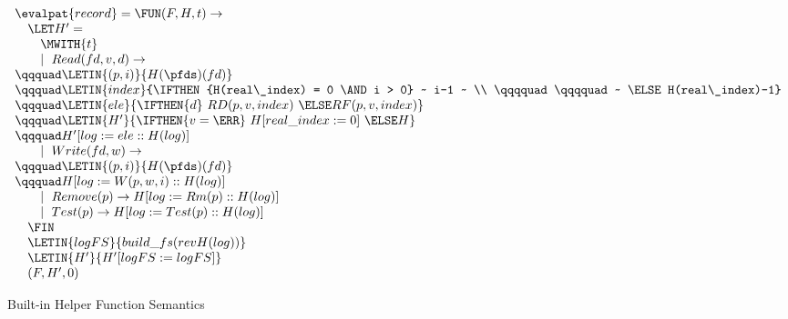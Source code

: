 \begin{figure*}
\begin{minipage}[t]{0.5\linewidth}
\begin{displaymath}
\begin{array}{l}
\\
\evalpat{record} = \FUN (F,H,t) \rightarrow \\
\quad \LET H' = \\
\qquad \MWITH{t} \\
\qquad \mid~Read(fd,v,d) \rightarrow \\
\qqquad \LETIN{(p,i)}{H(\pfds)(fd)} \\
\qqquad \LETIN{index}{\IFTHEN{H(real\_index) = 0 \AND i > 0} ~ i-1 ~ \\
\qqqquad \qqqquad ~ \ELSE H(real\_index)-1} \\
\qqquad \LETIN{ele}{\IFTHEN{d}~ RD(p,v,index) ~ \ELSE RF(p,v,index)} \\
\qqquad \LETIN{H'}{\IFTHEN{v=\ERR}~ H[real\_index := 0] ~ \ELSE H} \\
\qqquad H'[log := ele :: H(log)] \\
\qquad \mid~Write(fd,w) \rightarrow \\
\qqquad \LETIN{(p,i)}{H(\pfds)(fd)} \\
\qqquad H[log := W(p,w,i) :: H(log)] \\
\qquad \mid~Remove(p) \rightarrow H[log := Rm(p) :: H(log)] \\
\qquad \mid~Test(p) \rightarrow H[log := Test(p) :: H(log)] \\
\quad \FIN \\
\quad \LETIN{logFS}{build\_fs (rev H(log))} \\
\quad \LETIN{H'}{H'[logFS := logFS]} \\
\quad (F,H',0)
\end{array}
\end{displaymath}
\end{minipage}
\caption{Built-in Helper Function Semantics}
\end{figure*}

